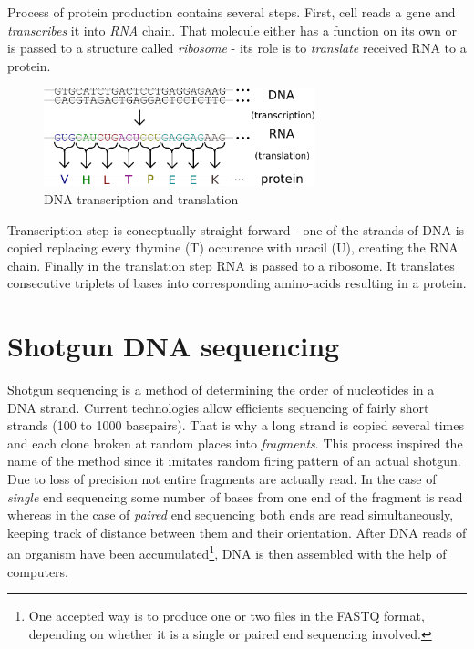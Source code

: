 \documentclass[times, utf8, diplomski]{fer}
\begin{document}
Process of protein production contains several steps. First, cell reads a gene and \emph{transcribes} it into \emph{RNA} chain. That molecule either has a function on its own or is passed to a structure called \emph{ribosome} - its role is to \emph{translate} received RNA to a protein.
\\

\begin{figure}[!ht]
\begin{center}
	\includegraphics[width=0.7\textwidth]{../img/Genetic_code.pdf}
	\caption{DNA transcription and translation\cite{dna.transcription.translation.img}}\label{genetic.code}
\end{center}
\end{figure}

Transcription step is conceptually straight forward - one of the strands of DNA is copied replacing every thymine (T) occurence with uracil (U), creating the RNA chain. Finally in the translation step RNA is passed to a ribosome. It translates consecutive triplets of bases into corresponding amino-acids resulting in a protein. 

\section{Shotgun DNA sequencing}

Shotgun sequencing is a method of determining the order of nucleotides in a DNA strand. Current technologies allow efficients sequencing of fairly short strands (100 to 1000 basepairs). That is why a long strand is copied several times and each clone broken at random places into \emph{fragments}. This process inspired the name of the method since it imitates random firing pattern of an actual shotgun. Due to loss of precision not entire fragments are actually read. In the case of \emph{single} end sequencing some number of bases from one end of the fragment is read whereas in the case of \emph{paired} end sequencing both ends are read simultaneously, keeping track of distance between them and their orientation. After DNA reads of an organism have been accumulated\footnote{One accepted way is to produce one or two files in the FASTQ format, depending on whether it is a single or paired end sequencing involved.}, DNA is then assembled with the help of computers. 
\end{document}
